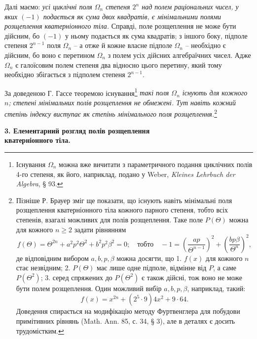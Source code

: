 \documentclass[11pt]{article}
\begin{document}
\noindent Далі маємо: \emph{усі циклічні поля $\Omega_n$ степеня $2^n$ над полем раціональних чисел, у яких $(-1)$ подається як сума двох квадратів, є мінімальними полями розщеплення кватерніонного тіла.} Справді, поле розщеплення не може бути дійсним, бо $(-1)$ у ньому подається як сума квадратів; з іншого боку, підполе степеня $2^{n-1}$ поля $\Omega_n$ -- а отже й кожне власне підполе $\Omega_n$ -- необхідно є дійсним, бо воно є перетином $\Omega_n$ з полем усіх дійсних алгебраїчних чисел. Адже $\Omega_n$ є галоїсовим полем степеня два відносно цього перетину, який тому необхідно збігається з підполем степеня $2^{n-1}$.

\medskip

\noindent За доведеною Г. Гассе теоремою існування\footnote{Існування $\Omega_n$ можна вже вичитати з параметричного подання циклічних полів 4-го степеня, як його, наприклад, подано у Weber, \emph{Kleines Lehrbuch der Algebra}, § 93.} \emph{такі поля $\Omega_n$ існують для кожного $n$; степені мінімальних полів розщеплення не обмежені. Тут навіть кожний степінь індексу виступає як степінь мінімального поля розщеплення.}\footnote{Пізніше Р. Брауер зміг ще показати, що існують навіть мінімальні поля розщеплення кватерніонного тіла кожного парного степеня, тобто всіх степенів, взагалі можливих для полів розщеплення. Таке поле $P(\Theta)$ можна для кожного $n\ge2$ задати рівнянням
\[
 f(\Theta)=\Theta^{2n}+a^2p^2\Theta^2+b^2p^2\beta^2=0;
 \quad \text{тобто}\quad -1=\left(\frac{ap}{\Theta^{n-1}}\right)^2+
       \left(\frac{bp\beta}{\Theta^n}\right)^2,
\]
де відповідним вибором $a,b,p,\beta$ можна досягти, що 1. $f(x)$ для кожного $n$ стає незвідним; 2. $P(\Theta)$ має лише одне підполе, відмінне від $P$, а саме $P(\Theta^2)$; 3. серед спряжених до $P(\Theta^2)$ є також дійсні, тож воно не може бути полем розщеплення. Один можливий вибір $a,b,p,\beta$, наприклад, такий:
\[
        f(x)=x^{2n}+(2^5\cdot9)4x^2+9\cdot64.
\]
Доведення спирається на модифікацію методу Фуртвенглера для побудови примітивних рівнянь (Math. Ann. 85, с. 34, § 3), але в деталях є досить трудомістким.}

\begin{center}
\textbf{3. Елементарний розгляд полів розщеплення\\
кватерніонного тіла.}
\end{center}
\end{document}
